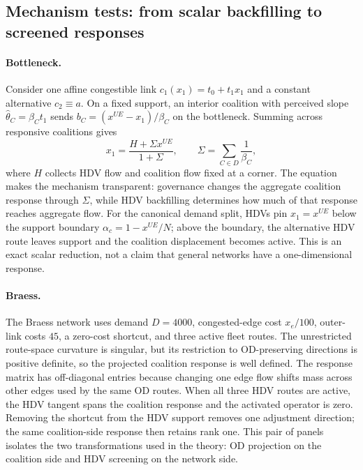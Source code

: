 \subsection{Mechanism tests: from scalar backfilling to screened responses}

\paragraph{Bottleneck.} Consider one affine congestible link $c_1(x_1)=t_0+t_1x_1$ and a constant alternative $c_2\equiv a$. On a fixed support, an interior coalition with perceived slope $\widehat\theta_C=\beta_Ct_1$ sends $b_C=(x^{UE}-x_1)/\beta_C$ on the bottleneck. Summing across responsive coalitions gives
\begin{equation}\label{eq:bottleneck-response}
 x_1=\frac{H+\Sigma x^{UE}}{1+\Sigma},
 \qquad
 \Sigma=\sum_{C\in D}\frac{1}{\beta_C},
\end{equation}
where $H$ collects HDV flow and coalition flow fixed at a corner. The equation makes the mechanism transparent: governance changes the aggregate coalition response through $\Sigma$, while HDV backfilling determines how much of that response reaches aggregate flow. For the canonical demand split, HDVs pin $x_1=x^{UE}$ below the support boundary $\alpha_c=1-x^{UE}/N$; above the boundary, the alternative HDV route leaves support and the coalition displacement becomes active. This is an exact scalar reduction, not a claim that general networks have a one-dimensional response.

\paragraph{Braess.} The Braess network uses demand $D=4000$, congested-edge cost $x_e/100$, outer-link costs $45$, a zero-cost shortcut, and three active fleet routes. The unrestricted route-space curvature is singular, but its restriction to OD-preserving directions is positive definite, so the projected coalition response is well defined. The response matrix has off-diagonal entries because changing one edge flow shifts mass across other edges used by the same OD routes. When all three HDV routes are active, the HDV tangent spans the coalition response and the activated operator is zero. Removing the shortcut from the HDV support removes one adjustment direction; the same coalition-side response then retains rank one. This pair of panels isolates the two transformations used in the theory: OD projection on the coalition side and HDV screening on the network side.

